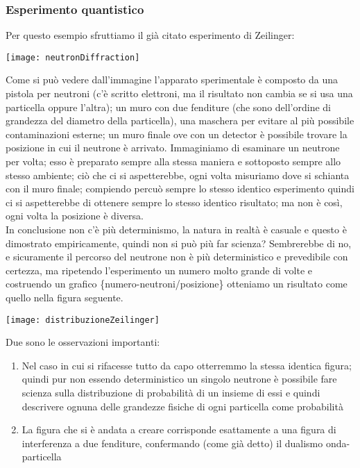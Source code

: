 \subsubsection{Esperimento quantistico}
Per questo esempio sfruttiamo il già citato esperimento di Zeilinger:
\begin{center} \texttt{[image: neutronDiffraction]} \end{center}
Come si può vedere dall'immagine l'apparato sperimentale è composto da una pistola per neutroni (c'è scritto elettroni, ma il risultato non cambia se si usa una particella oppure l'altra); un muro con due fenditure (che sono dell'ordine di grandezza del diametro della particella), una maschera per evitare al più possibile contaminazioni esterne; un muro finale ove con un detector è possibile trovare la posizione in cui il neutrone è arrivato.
Immaginiamo di esaminare un neutrone per volta; esso è preparato sempre alla stessa maniera e sottoposto sempre allo stesso ambiente; ciò che ci si aspetterebbe, ogni volta misuriamo dove si schianta con il muro finale; compiendo percuò sempre lo stesso identico esperimento quindi ci si aspetterebbe di ottenere sempre lo stesso identico risultato; ma non è così, ogni volta la posizione è diversa.\\
In conclusione non c'è più determinismo, la natura in realtà è casuale e questo è dimostrato empiricamente, quindi non si può più far scienza? Sembrerebbe di no, e sicuramente il percorso del neutrone non è più deterministico e prevedibile con certezza, ma ripetendo l'esperimento un numero molto grande di volte e costruendo un grafico \{numero-neutroni/posizione\} otteniamo un risultato come quello nella figura seguente.
\begin{center} \texttt{[image: distribuzioneZeilinger]} \end{center}
Due sono le osservazioni importanti:
\begin{enumerate}
\item Nel caso in cui si rifacesse tutto da capo otterremmo la stessa identica figura; quindi pur non essendo deterministico un singolo neutrone è possibile fare scienza sulla distribuzione di probabilità di un insieme di essi e quindi descrivere ognuna delle grandezze fisiche di ogni particella come probabilità
\item La figura che si è andata a creare corrisponde esattamente a una figura di interferenza a due fenditure, confermando (come già detto) il dualismo onda-particella
\end{enumerate}
